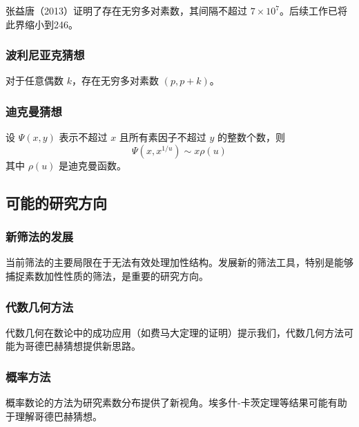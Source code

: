 张益唐（2013）证明了存在无穷多对素数，其间隔不超过 $7 \times 10^7$。后续工作已将此界缩小到246。

\subsubsection{波利尼亚克猜想}

\begin{conjecture}[波利尼亚克猜想]
    对于任意偶数 $k$，存在无穷多对素数 $(p, p+k)$。
\end{conjecture}

\subsubsection{迪克曼猜想}

\begin{conjecture}[迪克曼猜想]
    设 $\Psi(x,y)$ 表示不超过 $x$ 且所有素因子不超过 $y$ 的整数个数，则
    \begin{equation}
        \Psi(x,x^{1/u}) \sim x \rho(u)
    \end{equation}
    其中 $\rho(u)$ 是迪克曼函数。
\end{conjecture}

\subsection{可能的研究方向}

\subsubsection{新筛法的发展}

当前筛法的主要局限在于无法有效处理加性结构。发展新的筛法工具，特别是能够捕捉素数加性性质的筛法，是重要的研究方向。

\subsubsection{代数几何方法}

代数几何在数论中的成功应用（如费马大定理的证明）提示我们，代数几何方法可能为哥德巴赫猜想提供新思路。

\subsubsection{概率方法}

概率数论的方法为研究素数分布提供了新视角。埃多什-卡茨定理等结果可能有助于理解哥德巴赫猜想。

